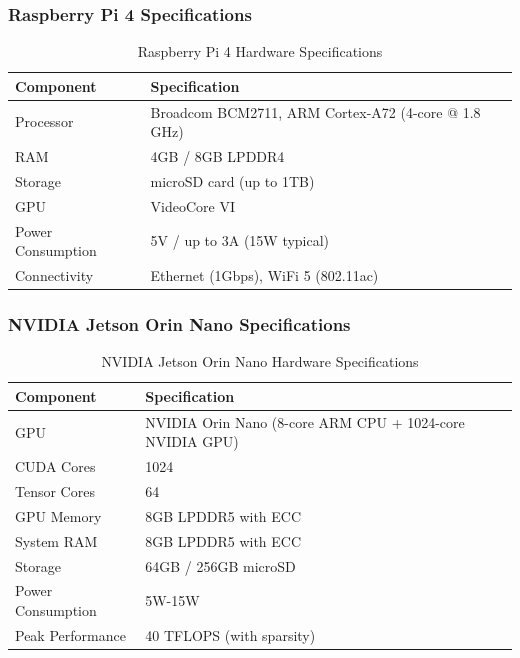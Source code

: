 \documentclass[11pt,a4paper]{article}
\begin{document}
\subsubsection{Raspberry Pi 4 Specifications}

\begin{table}[H]
    \centering
    \caption{Raspberry Pi 4 Hardware Specifications}
    \label{tab:rpi4_specs}
    \begin{tabular}{|l|l|}
    \hline
    \textbf{Component} & \textbf{Specification} \\
    \hline
    Processor & Broadcom BCM2711, ARM Cortex-A72 (4-core @ 1.8 GHz) \\
    RAM & 4GB / 8GB LPDDR4 \\
    Storage & microSD card (up to 1TB) \\
    GPU & VideoCore VI \\
    Power Consumption & 5V / up to 3A (15W typical) \\
    Connectivity & Ethernet (1Gbps), WiFi 5 (802.11ac) \\
    \hline
    \end{tabular}
\end{table}

\subsubsection{NVIDIA Jetson Orin Nano Specifications}

\begin{table}[H]
    \centering
    \caption{NVIDIA Jetson Orin Nano Hardware Specifications}
    \label{tab:jetson_specs}
    \begin{tabular}{|l|l|}
    \hline
    \textbf{Component} & \textbf{Specification} \\
    \hline
    GPU & NVIDIA Orin Nano (8-core ARM CPU + 1024-core NVIDIA GPU) \\
    CUDA Cores & 1024 \\
    Tensor Cores & 64 \\
    GPU Memory & 8GB LPDDR5 with ECC \\
    System RAM & 8GB LPDDR5 with ECC \\
    Storage & 64GB / 256GB microSD \\
    Power Consumption & 5W-15W \\
    Peak Performance & 40 TFLOPS (with sparsity) \\
    \hline
    \end{tabular}
\end{table}
\end{document}

